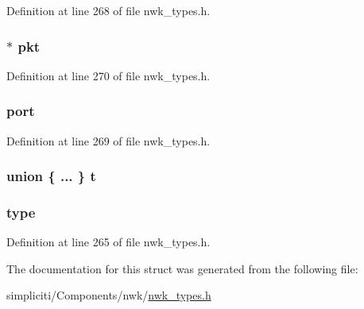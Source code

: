 \-Definition at line 268 of file nwk\-\_\-types.\-h.

\hypertarget{structrcvContext__t_ad103301359467b3f838dbf32b25299a8}{
\subsubsection[{pkt}]{$\ast$ {\bf pkt}}}\label{structrcvContext__t_ad103301359467b3f838dbf32b25299a8}


\-Definition at line 270 of file nwk\-\_\-types.\-h.

\hypertarget{structrcvContext__t_a2fa54f9024782843172506fadbee2ac8}{
\subsubsection[{port}]{ {\bf port}}}\label{structrcvContext__t_a2fa54f9024782843172506fadbee2ac8}


\-Definition at line 269 of file nwk\-\_\-types.\-h.

\hypertarget{structrcvContext__t_a15f73357939d5a39511cda6e8eb5d198}{
\subsubsection[{t}]{\setlength{\rightskip}{0pt plus 5cm}union \{ ... \}   {\bf t}}}\label{structrcvContext__t_a15f73357939d5a39511cda6e8eb5d198}
\hypertarget{structrcvContext__t_a3db35c24c9a9e3bbc08b807e05ad5c58}{
\subsubsection[{type}]{ {\bf type}}}\label{structrcvContext__t_a3db35c24c9a9e3bbc08b807e05ad5c58}


\-Definition at line 265 of file nwk\-\_\-types.\-h.



\-The documentation for this struct was generated from the following file\-:\begin{DoxyCompactItemize}
\item 
simpliciti/\-Components/nwk/\hyperlink{nwk__types_8h}{nwk\-\_\-types.\-h}\end{DoxyCompactItemize}
